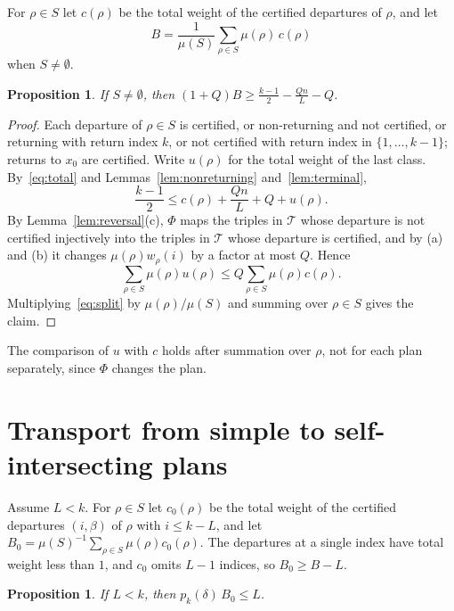 \documentclass[11pt]{amsart}
\newtheorem{proposition}[theorem]{Proposition}
\theoremstyle{remark}
\begin{document}
For $\rho\in S$ let $c(\rho)$ be the total weight of the certified departures of $\rho$, and let
\[
B=\frac1{\mu(S)}\sum_{\rho\in S}\mu(\rho)\,c(\rho)
\]
when $S\ne\emptyset$.

\begin{proposition}\label{prop:certified}
If $S\ne\emptyset$, then $(1+Q)B\ge\frac{k-1}2-\frac{Qn}L-Q$.
\end{proposition}

\begin{proof}
Each departure of $\rho\in S$ is certified, or non-returning and not certified, or returning with return index $k$,
or not certified with return index in $\{1,\dots,k-1\}$; returns to $x_0$ are certified. Write $u(\rho)$ for the total
weight of the last class. By~\eqref{eq:total} and Lemmas~\ref{lem:nonreturning} and~\ref{lem:terminal},
\begin{equation}\label{eq:split}
\frac{k-1}2\le c(\rho)+\frac{Qn}L+Q+u(\rho).
\end{equation}
By Lemma~\ref{lem:reversal}(c), $\Phi$ maps the triples in $\mathcal T$ whose departure is not certified injectively
into the triples in $\mathcal T$ whose departure is certified, and by (a) and (b) it changes $\mu(\rho)w_\rho(i)$ by a
factor at most $Q$. Hence
\[
\sum_{\rho\in S}\mu(\rho)u(\rho)\le Q\sum_{\rho\in S}\mu(\rho)c(\rho).
\]
Multiplying~\eqref{eq:split} by $\mu(\rho)/\mu(S)$ and summing over $\rho\in S$ gives the claim.
\end{proof}

The comparison of $u$ with $c$ holds after summation over $\rho$, not for each plan separately, since $\Phi$ changes the
plan.

\section{Transport from simple to self-intersecting plans}\label{sec:flow}

Assume $L<k$. For $\rho\in S$ let $c_0(\rho)$ be the total weight of the certified departures $(i,\beta)$ of $\rho$ with
$i\le k-L$, and let $B_0=\mu(S)^{-1}\sum_{\rho\in S}\mu(\rho)c_0(\rho)$. The departures at a single index have total
weight less than $1$, and $c_0$ omits $L-1$ indices, so $B_0\ge B-L$.

\begin{proposition}\label{prop:flow}
If $L<k$, then $p_k(\delta)\,B_0\le L$.
\end{proposition}
\end{document}
